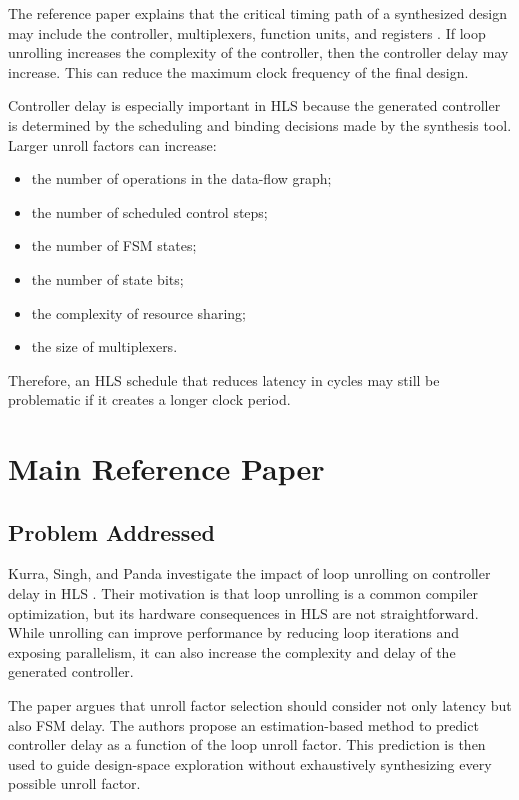 \documentclass[conference]{IEEEtran}
\begin{document}
The reference paper explains that the critical timing path of a synthesized design may include the controller, multiplexers, function units, and registers \cite{kurra2007}. If loop unrolling increases the complexity of the controller, then the controller delay may increase. This can reduce the maximum clock frequency of the final design.

Controller delay is especially important in HLS because the generated controller is determined by the scheduling and binding decisions made by the synthesis tool. Larger unroll factors can increase:

\begin{itemize}
    \item the number of operations in the data-flow graph;
    \item the number of scheduled control steps;
    \item the number of FSM states;
    \item the number of state bits;
    \item the complexity of resource sharing;
    \item the size of multiplexers.
\end{itemize}

Therefore, an HLS schedule that reduces latency in cycles may still be problematic if it creates a longer clock period.

\section{Main Reference Paper}

\subsection{Problem Addressed}

Kurra, Singh, and Panda investigate the impact of loop unrolling on controller delay in HLS \cite{kurra2007}. Their motivation is that loop unrolling is a common compiler optimization, but its hardware consequences in HLS are not straightforward. While unrolling can improve performance by reducing loop iterations and exposing parallelism, it can also increase the complexity and delay of the generated controller.

The paper argues that unroll factor selection should consider not only latency but also FSM delay. The authors propose an estimation-based method to predict controller delay as a function of the loop unroll factor. This prediction is then used to guide design-space exploration without exhaustively synthesizing every possible unroll factor.
\end{document}
